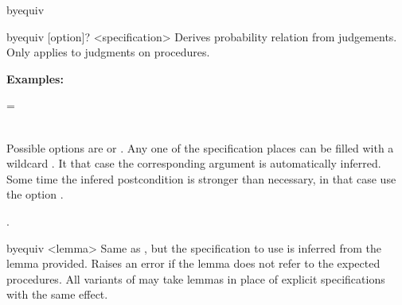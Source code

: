 \begin{tactic}{byequiv}

  \begin{tsyntax}{byequiv [option]? <specification>}
  Derives probability relation from \prhl judgements. 
  Only applies to judgments on procedures.
 
  \textbf{Examples:}
  \begin{mathpar}
    {  =  }%
    \quad{} \\
    {  \leq {} }%
    \quad{} \\
    {  \geq {} }%
  \end{mathpar}
 
 \end{tsyntax}

  Possible options are  or .
  Any one of the specification places can be filled
  with a wildcard \tct{_}. It that case the corresponding argument 
  is automatically inferred. Some time the infered postcondition  
  is stronger than necessary, in that case use the option .

  .
  
  \begin{tsyntax}{byequiv <lemma>}
  Same as , but the specification to use is 
  inferred from the lemma provided. Raises an error if the lemma does 
  not refer to the expected procedures. All variants of  
  may take lemmas in place of explicit specifications with the same effect.
  \end{tsyntax}


\end{tactic}
